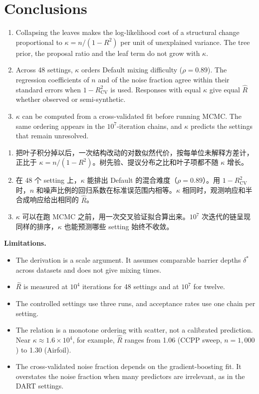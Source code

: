 \documentclass[11pt]{article}
\newcommand{\zhfont}{}
\newcommand{\Rhat}{\hat R}
\begin{document}
\section{Conclusions\quad{\zhfont 结论}}
\begin{enumerate}
\item Collapsing the leaves makes the log-likelihood cost of a structural change proportional to $\kappa=n/(1-R^2)$ per unit of unexplained variance. The tree prior, the proposal ratio and the leaf term do not grow with $\kappa$.
\item Across 48 settings, $\kappa$ orders Default mixing difficulty ($\rho=0.89$). The regression coefficients of $n$ and of the noise fraction agree within their standard errors when $1-R^2_{\mathrm{CV}}$ is used. Responses with equal $\kappa$ give equal $\Rhat$ whether observed or semi-synthetic.
\item $\kappa$ can be computed from a cross-validated fit before running MCMC. The same ordering appears in the $10^7$-iteration chains, and $\kappa$ predicts the settings that remain unresolved.
\end{enumerate}

\begin{zhbox}
\begin{enumerate}
\item 把叶子积分掉以后，一次结构改动的对数似然代价，按每单位未解释方差计，正比于 $\kappa=n/(1-R^2)$。树先验、提议分布之比和叶子项都不随 $\kappa$ 增长。
\item 在 48 个 setting 上，$\kappa$ 能排出 Default 的混合难度（$\rho=0.89$）。用 $1-R^2_{\mathrm{CV}}$ 时，$n$ 和噪声比例的回归系数在标准误范围内相等。$\kappa$ 相同时，观测响应和半合成响应给出相同的 $\Rhat$。
\item $\kappa$ 可以在跑 MCMC 之前，用一次交叉验证拟合算出来。$10^7$ 次迭代的链呈现同样的排序，$\kappa$ 也能预测哪些 setting 始终不收敛。
\end{enumerate}
\end{zhbox}


\textbf{Limitations.}
\begin{itemize}
\item The derivation is a scale argument. It assumes comparable barrier depths $\delta^\ast$ across datasets and does not give mixing times.
\item $\Rhat$ is measured at $10^4$ iterations for 48 settings and at $10^7$ for twelve.
\item The controlled settings use three runs, and acceptance rates use one chain per setting.
\item The relation is a monotone ordering with scatter, not a calibrated prediction. Near $\kappa\approx1.6\times10^4$, for example, $\Rhat$ ranges from 1.06 (CCPP sweep, $n=1{,}000$) to 1.30 (Airfoil).
\item The cross-validated noise fraction depends on the gradient-boosting fit. It overstates the noise fraction when many predictors are irrelevant, as in the DART settings.
\end{itemize}
\end{document}
